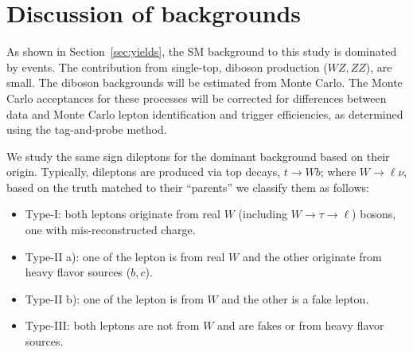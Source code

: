 \section{Discussion of backgrounds}
\label{sec:bkgtypes}

As shown in Section~\ref{sec:yields}, the SM background to this study is dominated 
by \ttbar events. The contribution from single-top, diboson production ($WZ, ZZ$), 
are small. The diboson backgrounds will be estimated from Monte Carlo. 
The Monte Carlo acceptances for these processes will be corrected for differences between 
data and Monte Carlo lepton identification and trigger efficiencies, as determined using 
the tag-and-probe method.

We study the same sign dileptons for the dominant \ttbar background based on their origin.
Typically, dileptons are produced via top decays, $t \rightarrow W b$; where 
$W \rightarrow \ell \nu $, based on the truth matched to their ``parents'' we classify them 
as follows:

\begin{itemize}
\item Type-I: both leptons originate from real $W$ (including $W \rightarrow \tau \rightarrow \ell$) bosons, one with mis-reconstructed charge.
\item Type-II a): one of the lepton is from real $W$ and the other originate from heavy flavor sources ($b, c$).
\item Type-II b): one of the lepton is from $W$ and the other is a fake lepton.
\item Type-III: both leptons are not from $W$ and are fakes or from heavy flavor sources.
\end{itemize} 

